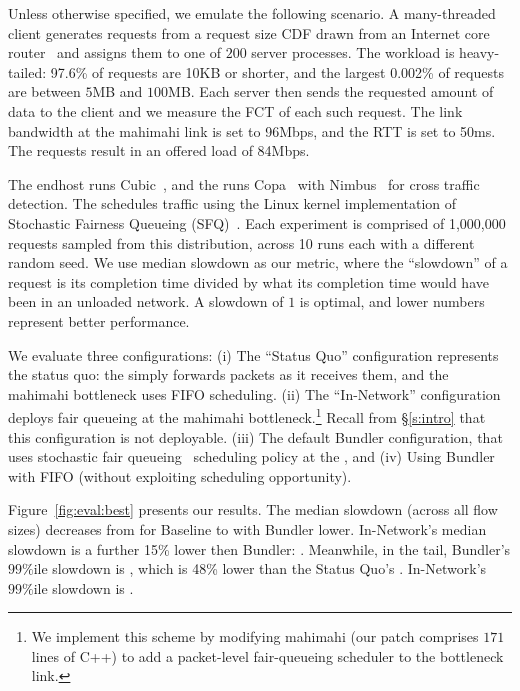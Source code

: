 Unless otherwise specified, we emulate the following scenario.
A many-threaded client generates requests from a request size CDF drawn from an Internet core router~\cite{caida-dataset} and assigns them to one of $200$ server processes.
The workload is heavy-tailed: 97.6\% of requests are 10KB or shorter, and the largest 0.002\% of requests are between $5$MB and $100$MB.
Each server then sends the requested amount of data to the client and we measure the FCT of each such request. 
The link bandwidth at the mahimahi link is set to 96Mbps, and the RTT is set to 50ms. The requests result in an offered load of 84Mbps. 

The endhost runs Cubic~\cite{cubic}, and the \inbox runs Copa~\cite{copa} with Nimbus~\cite{nimbus} for cross traffic detection.
The \inbox schedules traffic using the Linux kernel implementation of Stochastic Fairness Queueing (SFQ)~\cite{sfq}.
Each experiment is comprised of 1,000,000 requests sampled from this distribution, across 10 runs each with a different random seed.
We use median slowdown as our metric, where the ``slowdown'' of a request is its completion time divided by what its completion time would have been in an unloaded network. A slowdown of $1$ is optimal, and lower numbers represent better performance.


\newcommand{\baseline}{Status Quo\xspace}
\newcommand{\optimal}{In-Network\xspace}

We evaluate three configurations: 
(i) The ``\baseline'' configuration represents the status quo: the \inbox simply forwards packets as it receives them, and the mahimahi bottleneck uses FIFO scheduling.
(ii) The ``\optimal'' configuration deploys fair queueing
at the mahimahi bottleneck.\footnote{
We implement this scheme by modifying mahimahi (our patch comprises $171$ lines of C++) to add a packet-level fair-queueing scheduler to the bottleneck link.}
Recall from \S\ref{s:intro} that this configuration is not deployable.
(iii) The default Bundler configuration, that uses stochastic fair queueing~\cite{sfq} scheduling policy at the \inbox, and (iv) Using Bundler with FIFO (without exploiting scheduling opportunity).

Figure~\ref{fig:eval:best} presents our results. 
The median slowdown (across all flow sizes) decreases from \overviewBenefitsBaselineMedian 
for Baseline to \overviewBenefitsBundlerMedian 
with Bundler \overviewBenefitsBundlerMedianImprovement
lower. 
\optimal's median slowdown is a further 15\% lower then Bundler: \overviewBenefitsOptimalMedian.
Meanwhile, in the tail, Bundler's $99\%$ile slowdown is \overviewBenefitsBundlerTail, which is 48\% lower than the \baseline's \overviewBenefitsBaselineTail. \optimal's $99\%$ile slowdown is \overviewBenefitsOptimalTail.
